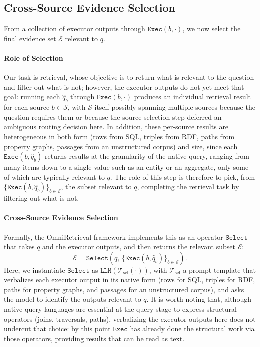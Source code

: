 \documentclass{llmxive}
\begin{document}
\subsection{Cross-Source Evidence Selection}

From a collection of executor outputs through $\texttt{Exec}(b, \cdot)$, we now select the final evidence set $\mathcal{E}$ relevant to $q$.

\paragraph{Role of Selection}
Our task is retrieval, whose objective is to return what is relevant to the question and filter out what is not; however, the executor outputs do not yet meet that goal: running each $\hat{q}_b$ through $\texttt{Exec}(b, \cdot)$ produces an individual retrieval result for each source $b \in \mathcal{S}$, with $\mathcal{S}$ itself possibly spanning multiple sources because the question requires them or because the source-selection step deferred an ambiguous routing decision here. In addition, these per-source results are heterogeneous in both form (rows from SQL, triples from RDF, paths from property graphs, passages from an unstructured corpus) and size, since each $\texttt{Exec}(b, \hat{q}_b)$ returns results at the granularity of the native query, ranging from many items down to a single value such as an entity or an aggregate, only some of which are typically relevant to $q$. The role of this step is therefore to pick, from $\{\texttt{Exec}(b, \hat{q}_b)\}_{b \in \mathcal{S}}$, the subset relevant to $q$, completing the retrieval task by filtering out what is not.

\paragraph{Cross-Source Evidence Selection}
Formally, the OmniRetrieval framework implements this as an operator $\texttt{Select}$ that takes $q$ and the executor outputs, and then returns the relevant subset $\mathcal{E}$:
\begin{equation}
\mathcal{E} = \texttt{Select}(q,\, \{\texttt{Exec}(b, \hat{q}_b)\}_{b \in \mathcal{S}}).
\end{equation}
Here, we instantiate $\texttt{Select}$ as $\texttt{LLM}(\mathcal{T}_{\text{sel}}(\cdot))$, with $\mathcal{T}_{\text{sel}}$ a prompt template that verbalizes each executor output in its native form (rows for SQL, triples for RDF, paths for property graphs, and passages for an unstructured corpus), and asks the model to identify the outputs relevant to $q$. It is worth noting that, although native query languages are essential at the query stage to express structural operators (joins, traversals, paths), verbalizing the executor outputs here does not undercut that choice: by this point $\texttt{Exec}$ has already done the structural work via those operators, providing results that can be read as text.
\end{document}
